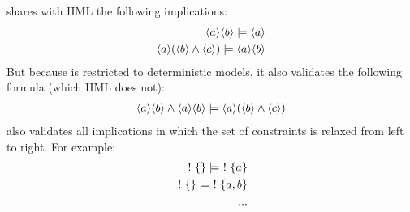 \begin{example}
\ELABR{} shares with HML the following implications:
\begin{eqnarray*}
\langle a \rangle \langle b \rangle \models \langle a \rangle \\
\langle a \rangle (\langle b \rangle \land \langle c \rangle ) \models \langle a \rangle \langle b \rangle \end{eqnarray*}
But because \ELABR{} is restricted to deterministic models, it also validates the following formula (which HML does not):
\begin{eqnarray*}
\langle a \rangle \langle b \rangle \land \langle a \rangle \langle b \rangle \models \langle a \rangle (\langle b \rangle \land \langle c \rangle )
\end{eqnarray*}
\ELABR{} also validates all implications in which the set of constraints is relaxed from left to right. For example:
\begin{eqnarray*}
\ ! \  \{\} \models \ ! \  \{a\} \\
\ ! \  \{\} \models \ ! \  \{a, b\} \\
...
\end{eqnarray*}
\end{example}
